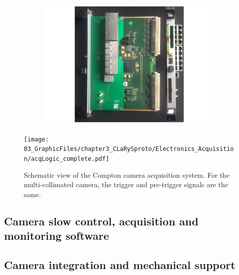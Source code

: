 \begin{figure}
\begin{subfigure}[t]{.28\textwidth}
\caption{}
\label{chap3::fig::AMC40}
\end{subfigure}
\begin{subfigure}[t]{.36\textwidth}
\centering
\includegraphics[width=1\textwidth]{03_GraphicFiles/chapter3_CLaRySproto/Electronics_Acquisition/THOR.pdf}
\caption{}
\label{chap3::fig::THOR}
\end{subfigure}
\caption{}
\label{chap3::fig::AcquisitionSystem}
\end{figure}


\begin{figure}[!htbp]
\centering
\texttt{[image: 03\_GraphicFiles/chapter3\_CLaRySproto/Electronics\_Acquisition/acqLogic\_complete.pdf]}
\caption{Schematic view of the Compton camera acquisition system. For the multi-collimated camera, the trigger and pre-trigger signals are the same.}
\label{chap3::fig::DAQscheme}
\end{figure}



\subsection{Camera slow control, acquisition and monitoring software}\label{chap3::subsec::cameraSoftware}


\subsection{Camera integration and mechanical support}\label{chap3::subsec::CameraMechanics}

